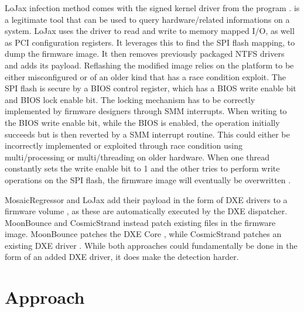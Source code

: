 LoJax infection method comes with the signed kernel driver from the program .
 is a legitimate tool that can be used to query hardware\-/related informations on a system.
LoJax uses the driver to read and write to memory mapped \ac{I/O}, as well as \ac{PCI} configuration registers.
It leverages this to find the \ac{SPI} flash mapping, to dump the firmware image.
It then removes previously packaged \ac{NTFS} drivers and adds its payload.
Reflashing the modified image relies on the platform to be either misconfigured or of an older kind that has a race condition exploit.
The \ac{SPI} flash is secure by a \ac{BIOS} control register, which has a \ac{BIOS} write enable bit and \ac{BIOS} lock enable bit.
The locking mechanism has to be correctly implemented by firmware designers through \ac{SMM} interrupts.
When writing to the \ac{BIOS} write enable bit, while the \ac{BIOS} is enabled, the operation initially succeeds but is then reverted by a \ac{SMM} interrupt routine.
This could either be incorrectly implemented or exploited through race condition using multi\-/processing or multi\-/threading on older hardware.
When one thread constantly sets the write enable bit to 1 and the other tries to perform write operations on the \ac{SPI} flash, the firmware image will eventually be overwritten \cite{lojax}.

MosaicRegressor and LoJax add their payload in the form of \ac{DXE} drivers to a firmware volume \cite{mosaicregressor-technical-details,lojax}, as these are automatically executed by the \ac{DXE} dispatcher.
MoonBounce and CosmicStrand instead patch existing files in the firmware image.
MoonBounce patches the \ac{DXE} Core \cite{moonbounce}, while CosmicStrand patches an existing \ac{DXE} driver \cite{cosmicstrand}.
While both approaches could fundamentally be done in the form of an added \ac{DXE} driver, it does make the detection harder.

\section{Approach}

